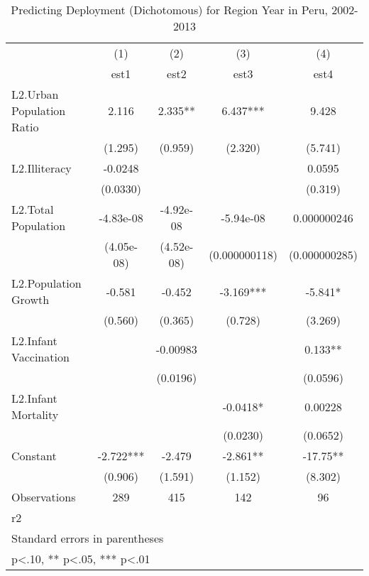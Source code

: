 \begin{table}[htbp]\centering
\def\sym#1{\ifmmode^{#1}\else\(^{#1}\)\fi}
\caption{Predicting Deployment (Dichotomous) for Region Year in Peru, 2002-2013}
\begin{tabular}{l*{4}{c}}
\hline\hline
                    &\multicolumn{1}{c}{(1)}&\multicolumn{1}{c}{(2)}&\multicolumn{1}{c}{(3)}&\multicolumn{1}{c}{(4)}\\
                    &\multicolumn{1}{c}{est1}&\multicolumn{1}{c}{est2}&\multicolumn{1}{c}{est3}&\multicolumn{1}{c}{est4}\\
\hline
L2.Urban Population Ratio&       2.116   &       2.335** &       6.437***&       9.428   \\
                    &     (1.295)   &     (0.959)   &     (2.320)   &     (5.741)   \\
[1em]
L2.Illiteracy       &     -0.0248   &               &               &      0.0595   \\
                    &    (0.0330)   &               &               &     (0.319)   \\
[1em]
L2.Total Population &   -4.83e-08   &   -4.92e-08   &   -5.94e-08   & 0.000000246   \\
                    &  (4.05e-08)   &  (4.52e-08)   &(0.000000118)   &(0.000000285)   \\
[1em]
L2.Population Growth&      -0.581   &      -0.452   &      -3.169***&      -5.841*  \\
                    &     (0.560)   &     (0.365)   &     (0.728)   &     (3.269)   \\
[1em]
L2.Infant Vaccination&               &    -0.00983   &               &       0.133** \\
                    &               &    (0.0196)   &               &    (0.0596)   \\
[1em]
L2.Infant Mortality &               &               &     -0.0418*  &     0.00228   \\
                    &               &               &    (0.0230)   &    (0.0652)   \\
[1em]
Constant            &      -2.722***&      -2.479   &      -2.861** &      -17.75** \\
                    &     (0.906)   &     (1.591)   &     (1.152)   &     (8.302)   \\
\hline
Observations        &         289   &         415   &         142   &          96   \\
r2                  &               &               &               &               \\
\hline\hline
\multicolumn{5}{l}{\footnotesize Standard errors in parentheses}\\
\multicolumn{5}{l}{\footnotesize * p<.10, ** p<.05, *** p<.01}\\
\end{tabular}
\end{table}
